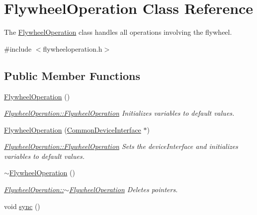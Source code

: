 \hypertarget{class_flywheel_operation}{}\section{Flywheel\+Operation Class Reference}
\label{class_flywheel_operation}


The \hyperlink{class_flywheel_operation}{Flywheel\+Operation} class handles all operations involving the flywheel.  




{\ttfamily \#include $<$flywheeloperation.\+h$>$}

\subsection*{Public Member Functions}
\begin{DoxyCompactItemize}
\item 
\hyperlink{class_flywheel_operation_a4735eb5ddf58ba1d0bf93e37a2885c76}{Flywheel\+Operation} ()
\begin{DoxyCompactList}\small\item\em \hyperlink{class_flywheel_operation_a4735eb5ddf58ba1d0bf93e37a2885c76}{Flywheel\+Operation\+::\+Flywheel\+Operation} Initializes variables to default values. \end{DoxyCompactList}\item 
\hyperlink{class_flywheel_operation_aca3144bf0bb443aaa8a2779624d2a5b2}{Flywheel\+Operation} (\hyperlink{class_common_device_interface}{Common\+Device\+Interface} $\ast$)
\begin{DoxyCompactList}\small\item\em \hyperlink{class_flywheel_operation_a4735eb5ddf58ba1d0bf93e37a2885c76}{Flywheel\+Operation\+::\+Flywheel\+Operation} Sets the device\+Interface and initializes variables to default values. \end{DoxyCompactList}\item 
\hyperlink{class_flywheel_operation_af8bc6d0e4f8dde30c067a97c5d8d0953}{$\sim$\+Flywheel\+Operation} ()
\begin{DoxyCompactList}\small\item\em \hyperlink{class_flywheel_operation_af8bc6d0e4f8dde30c067a97c5d8d0953}{Flywheel\+Operation\+::$\sim$\+Flywheel\+Operation} Deletes pointers. \end{DoxyCompactList}\item 
void \hyperlink{class_flywheel_operation_a61df04a204188bd187ce68f9d610e78a}{sync} ()
\item 

\end{DoxyCompactItemize}
